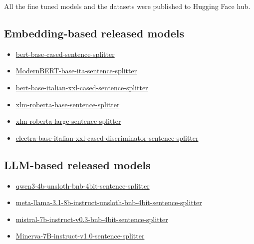 \documentclass[11pt]{article}
\begin{document}
All the fine tuned models and the datasets were published to Hugging Face 
hub.

\subsection{Embedding-based released models}

 \begin{itemize}
	\item \href{https://huggingface.co/fax4ever/bert-base-cased-sentence-splitter}{bert-base-cased-sentence-splitter}
	\item \href{https://huggingface.co/fax4ever/ModernBERT-base-ita-sentence-splitter}{ModernBERT-base-ita-sentence-splitter}
	\item \href{https://huggingface.co/fax4ever/bert-base-italian-xxl-cased-sentence-splitter}{bert-base-italian-xxl-cased-sentence-splitter}
	\item \href{https://huggingface.co/fax4ever/xlm-roberta-base-sentence-splitter}{xlm-roberta-base-sentence-splitter}
	\item \href{https://huggingface.co/fax4ever/xlm-roberta-large-sentence-splitter}{xlm-roberta-large-sentence-splitter}
	\item \href{https://huggingface.co/fax4ever/electra-base-italian-xxl-cased-discriminator-sentence-splitter}{electra-base-italian-xxl-cased-discriminator-sentence-splitter}
\end{itemize}

\subsection{LLM-based released models}

\begin{itemize}
	\item 
	\href{https://huggingface.co/fax4ever/qwen3-4b-unsloth-bnb-4bit-sentence-splitter}{qwen3-4b-unsloth-bnb-4bit-sentence-splitter}
	\item 
	\href{https://huggingface.co/fax4ever/meta-llama-3.1-8b-instruct-unsloth-bnb-4bit-sentence-splitter}{meta-llama-3.1-8b-instruct-unsloth-bnb-4bit-sentence-splitter}
	\item \href{https://huggingface.co/fax4ever/mistral-7b-instruct-v0.3-bnb-4bit-sentence-splitter}{mistral-7b-instruct-v0.3-bnb-4bit-sentence-splitter}
	\item \href{https://huggingface.co/fax4ever/Minerva-7B-instruct-v1.0-sentence-splitter}{Minerva-7B-instruct-v1.0-sentence-splitter}
\end{itemize}
\end{document}

